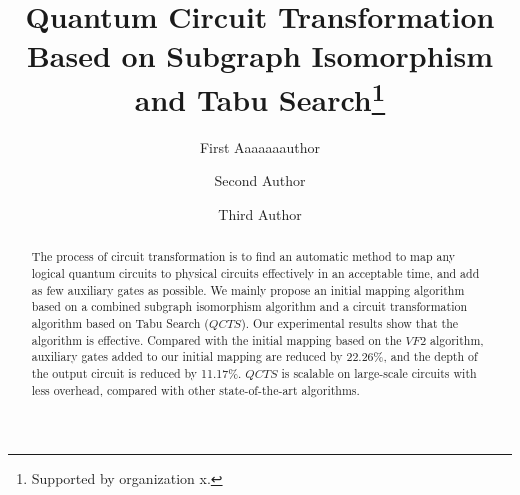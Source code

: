 \documentclass[runningheads]{llncs}
\begin{document}
%
\title{Quantum Circuit Transformation Based on Subgraph Isomorphism and Tabu Search\thanks{Supported by organization x.}}
%
%
\author{First Aaaaaaauthor \and
Second Author \and
Third Author}
%
%
%
\maketitle              %
%
\begin{abstract}
	The process of circuit transformation is to find an automatic method to map any logical quantum circuits to physical circuits effectively in an acceptable time, and add as few auxiliary gates as possible. We mainly propose an initial mapping algorithm based on a combined subgraph isomorphism algorithm and a circuit transformation algorithm based on Tabu Search ($QCTS$). Our experimental results show that the algorithm is effective. Compared with the initial mapping based on the $VF2$ algorithm, auxiliary gates added to our initial mapping are reduced by 22.26\%, and the depth of the output circuit is reduced by 11.17\%. $QCTS$ is scalable on large-scale circuits with less overhead, compared with other state-of-the-art algorithms.
\end{abstract}
\end{document}

